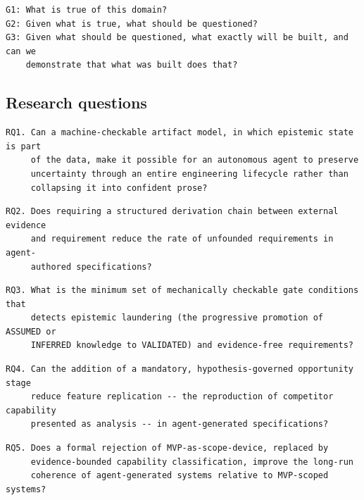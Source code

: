 \documentclass[11pt,a4paper]{article}
\begin{document}
\begin{Verbatim}[fontsize=\footnotesize,breaklines=true,breakanywhere=true,breakautoindent=false,samepage=false]
G1: What is true of this domain?
G2: Given what is true, what should be questioned?
G3: Given what should be questioned, what exactly will be built, and can we
    demonstrate that what was built does that?
\end{Verbatim}

\subsection{Research questions}

\begin{Verbatim}[fontsize=\footnotesize,breaklines=true,breakanywhere=true,breakautoindent=false,samepage=false]
RQ1. Can a machine-checkable artifact model, in which epistemic state is part
     of the data, make it possible for an autonomous agent to preserve
     uncertainty through an entire engineering lifecycle rather than
     collapsing it into confident prose?
\end{Verbatim}

\begin{Verbatim}[fontsize=\footnotesize,breaklines=true,breakanywhere=true,breakautoindent=false,samepage=false]
RQ2. Does requiring a structured derivation chain between external evidence
     and requirement reduce the rate of unfounded requirements in agent-
     authored specifications?
\end{Verbatim}

\begin{Verbatim}[fontsize=\footnotesize,breaklines=true,breakanywhere=true,breakautoindent=false,samepage=false]
RQ3. What is the minimum set of mechanically checkable gate conditions that
     detects epistemic laundering (the progressive promotion of ASSUMED or
     INFERRED knowledge to VALIDATED) and evidence-free requirements?
\end{Verbatim}

\begin{Verbatim}[fontsize=\footnotesize,breaklines=true,breakanywhere=true,breakautoindent=false,samepage=false]
RQ4. Can the addition of a mandatory, hypothesis-governed opportunity stage
     reduce feature replication -- the reproduction of competitor capability
     presented as analysis -- in agent-generated specifications?
\end{Verbatim}

\begin{Verbatim}[fontsize=\footnotesize,breaklines=true,breakanywhere=true,breakautoindent=false,samepage=false]
RQ5. Does a formal rejection of MVP-as-scope-device, replaced by
     evidence-bounded capability classification, improve the long-run
     coherence of agent-generated systems relative to MVP-scoped systems?
\end{Verbatim}
\end{document}
